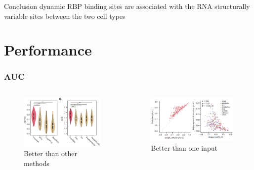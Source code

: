 \documentclass{ctexbeamer}
\begin{document}
\begin{frame}
\begin{columns}[T]
\begin{column}{0.5\textwidth}
\begin{figure}[H]
        \label{fig:snapshot}
      \end{figure}
    \end{column}
  \end{columns}
  \begin{block}{Conclusion}
  dynamic RBP binding sites are associated with the RNA structurally variable sites between the two cell types
  \end{block}
\end{frame}

\section{Performance}
\begin{frame}
  \frametitle{AUC}
    \begin{columns}[T]
    \begin{column}{0.5\textwidth}  
  \begin{figure}[H]
    \raggedright
    \includegraphics[width=\textwidth]{./figures/auc_models.png}
    \caption{Better than other methods}
    \label{fig:metods}
      \end{figure}
    \end{column}
    \begin{column}{0.5\textwidth}
  \begin{figure}[H]
    \raggedleft
    \includegraphics[width=\textwidth]{./figures/auc_input.png}
    \caption{Better than one input}
    \label{fig:inputs}
  \end{figure}
  \end{column}
  \end{columns}
\end{frame}
\end{document}
